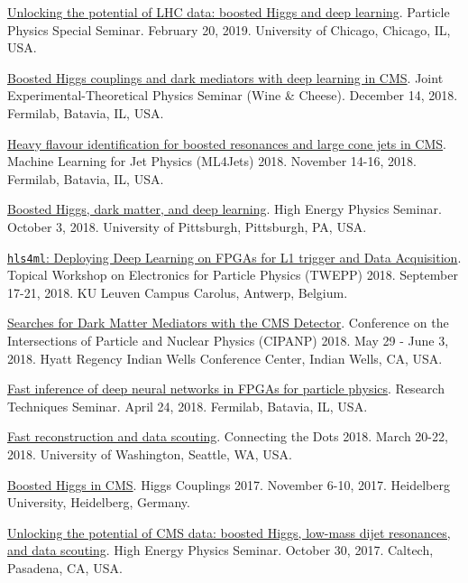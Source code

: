 \documentclass[11pt]{res}
\begin{document}
\begin{resume}
  \href{https://universityofchicago.hosted.panopto.com/Panopto/Pages/Viewer.aspx?id=66ca09d7-74c1-4b12-bb57-a9fa01046cdf}{Unlocking the potential of LHC data: boosted Higgs and deep learning}. Particle Physics Special Seminar. February 20, 2019. University of Chicago, Chicago, IL, USA.

  \href{http://theory.fnal.gov/events/event/results-from-cms-18/}{Boosted Higgs couplings and dark mediators with deep learning in CMS}. Joint Experimental-Theoretical Physics Seminar (Wine \& Cheese). December 14, 2018. Fermilab, Batavia, IL, USA.

  \href{https://indico.cern.ch/event/745718/contributions/3211982/}{Heavy flavour identification for boosted resonances and large cone jets in CMS}. Machine Learning for Jet Physics (ML4Jets) 2018. November 14-16, 2018. Fermilab, Batavia, IL, USA.

  \href{https://www.physicsandastronomy.pitt.edu/events/hep-seminar-javier-duarte-fermilab}{Boosted Higgs, dark matter, and deep learning}. High Energy Physics Seminar. October 3, 2018. University of Pittsburgh, Pittsburgh, PA, USA.

  \href{https://indico.cern.ch/event/697988/contributions/3055990/}{\texttt{hls4ml}: Deploying Deep Learning on FPGAs for L1 trigger and Data Acquisition}. Topical Workshop on Electronics for Particle Physics (TWEPP) 2018. September 17-21, 2018. KU Leuven Campus Carolus, Antwerp, Belgium.

  \href{https://conferences.lbl.gov/event/137/session/27/contribution/354}{Searches for Dark Matter Mediators with the CMS Detector}. Conference on the Intersections of Particle and Nuclear Physics (CIPANP) 2018. May 29 - June 3, 2018. Hyatt Regency Indian Wells Conference Center, Indian Wells, CA, USA.

  \href{https://indico.fnal.gov/event/16908/}{Fast inference of deep neural networks in FPGAs for particle physics}. Research Techniques Seminar. April 24, 2018. Fermilab, Batavia, IL, USA.

  \href{https://indico.cern.ch/event/658267/contributions/2881127/}{Fast reconstruction and data scouting}. Connecting the Dots 2018. March 20-22, 2018. University of Washington, Seattle, WA, USA.

  \href{http://www.thphys.uni-heidelberg.de/~higgs/talks/duarte.pdf}{Boosted Higgs in CMS}. Higgs Couplings 2017. November 6-10, 2017. Heidelberg University, Heidelberg, Germany.

  \href{https://indico.hep.caltech.edu/indico/conferenceDisplay.py?confId=149}{Unlocking the potential of CMS data: boosted Higgs, low-mass dijet resonances, and data scouting}. High Energy Physics Seminar. October 30, 2017. Caltech, Pasadena, CA, USA.


\end{resume}
\end{document}
